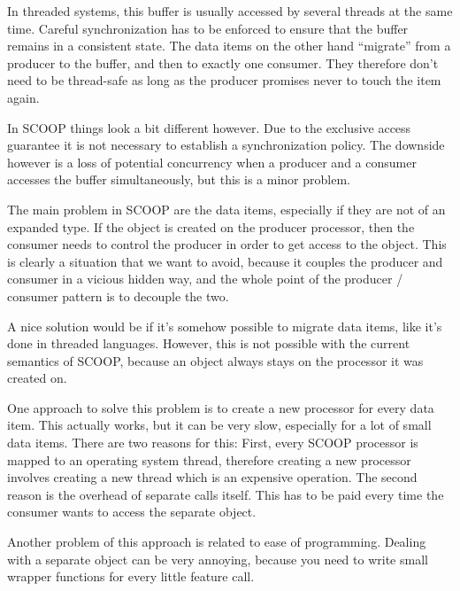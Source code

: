 \documentclass[a4paper,10pt]{report}
\begin{document}

In threaded systems, this buffer is usually accessed by several threads at the same time.
Careful synchronization has to be enforced to ensure that the buffer remains in a consistent state.
The data items on the other hand ``migrate'' from a producer to the buffer, and then to exactly one consumer.
They therefore don't need to be thread-safe as long as the producer promises never to touch the item again.

In SCOOP things look a bit different however.
Due to the exclusive access guarantee it is not necessary to establish a synchronization policy.
The downside however is a loss of potential concurrency when a producer and a consumer accesses the buffer simultaneously, but this is a minor problem.

The main problem in SCOOP are the data items, especially if they are not of an expanded type.
If the object is created on the producer processor, then the consumer needs to control the producer in order to get access to the object.
This is clearly a situation that we want to avoid, because it couples the producer and consumer in a vicious hidden way, and the whole point of the producer / consumer pattern is to decouple the two.

A nice solution would be if it's somehow possible to migrate data items, like it's done in threaded languages.
However, this is not possible with the current semantics of SCOOP, because an object always stays on the processor it was created on.

One approach to solve this problem is to create a new processor for every data item.
This actually works, but it can be very slow, especially for a lot of small data items.
There are two reasons for this:
First, every SCOOP processor is mapped to an operating system thread, therefore creating a new processor involves creating a new thread which is an expensive operation.
The second reason is the overhead of separate calls itself.
This has to be paid every time the consumer wants to access the separate object.

Another problem of this approach is related to ease of programming.
Dealing with a separate object can be very annoying, because you need to write small wrapper functions for every little feature call.
\end{document}
